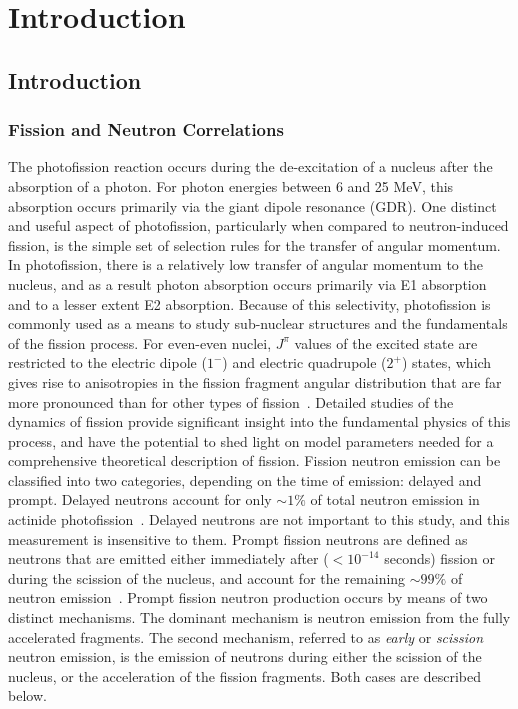 \chapter{Introduction}

\section{\label{sec:level1}Introduction}

\subsection{Fission and Neutron Correlations}
The photofission reaction occurs during the de-excitation of a nucleus after the absorption of a photon.
For photon energies between 6 and 25 MeV, this absorption occurs primarily via the giant dipole resonance (GDR).
One distinct and useful aspect of photofission, particularly when compared to neutron-induced fission, is the simple set of selection rules for the transfer of angular momentum.
In photofission, there is a relatively low transfer of angular momentum to the nucleus, and as a result photon absorption occurs primarily via E1 absorption and to a lesser extent E2 absorption.
Because of this selectivity, photofission is commonly used as a means to study sub-nuclear structures and the fundamentals of the fission process.
For even-even nuclei, $J^{\pi}$ values of the excited state are restricted to the electric dipole ($1^{-}$) and electric quadrupole ($2^{+}$) states, which gives rise to anisotropies in the fission fragment angular distribution that are far more pronounced than for other types of fission~\cite{1977FragAss}.
Detailed studies of the dynamics of fission provide significant insight into the fundamental physics of this process, and have the potential to shed light on model parameters needed for a comprehensive theoretical description of fission.
Fission neutron emission can be classified into two categories, depending on the time of emission: delayed and prompt.
Delayed neutrons account for only $\sim1\%$ of total neutron emission in actinide photofission~\cite{Caldwell2017DelayedNs}.
Delayed neutrons are not important to this study, and this measurement is insensitive to them.
Prompt fission neutrons are defined as neutrons that are emitted either immediately after ($<10^{-14}$ seconds) fission or during the scission of the nucleus, and account for the remaining $\sim99\%$ of neutron emission~\cite{Caldwell2017DelayedNs}.
Prompt fission neutron production occurs by means of two distinct mechanisms.
The dominant mechanism is neutron emission from the fully accelerated fragments.
The second mechanism, referred to as \textit{early} or \textit{scission} neutron emission, is the emission of neutrons during either the scission of the nucleus, or the acceleration of the fission fragments.
Both cases are described below.

